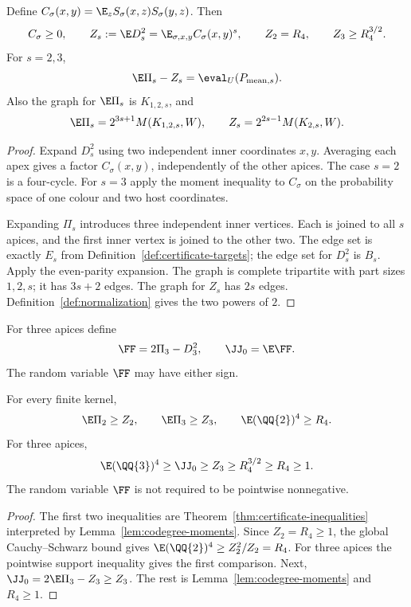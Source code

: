 \begin{lemma}
\label{lem:codegree-moments}
\proved Define $C_\sigma(x,y)=\E_zS_\sigma(x,z)S_\sigma(y,z)$.  Then
\[
 C_\sigma\ge0,\qquad
 Z_s:=\E D_s^2=\E_{\sigma,x,y}C_\sigma(x,y)^s,
 \qquad Z_2=R_4,\qquad Z_3\ge R_4^{3/2}.
\]
For $s=2,3$,
\[
 \E\Pi_s-Z_s=\eval_U(P_{\mathrm{mean},s}).
\]
Also the graph for $\E\Pi_s$ is $K_{1,2,s}$, and
\[
 \E\Pi_s=2^{3s+1}M(K_{1,2,s},W),\qquad
 Z_s=2^{2s-1}M(K_{2,s},W).
\]
\end{lemma}
\begin{proof}
Expand $D_s^2$ using two independent inner coordinates $x,y$.  Averaging each apex gives
a factor $C_\sigma(x,y)$, independently of the other apices.  The case $s=2$ is a four-cycle.
For $s=3$ apply the moment inequality to $C_\sigma$ on the probability space of one colour
and two host coordinates.

Expanding $\Pi_s$ introduces three independent inner vertices.  Each is joined to all
$s$ apices, and the first inner vertex is joined to the other two.  The edge set is exactly
$E_s$ from Definition~\ref{def:certificate-targets}; the edge set for $D_s^2$ is $B_s$.
Apply the even-parity expansion.  The graph is complete tripartite with part sizes $1,2,s$;
it has $3s+2$ edges.  The graph for $Z_s$ has $2s$ edges.  Definition~\ref{def:normalization}
gives the two powers of $2$.
\end{proof}

\begin{definition}
\label{def:three-apex-polynomial}
For three apices define
\[
 \FF=2\Pi_3-D_3^2,\qquad \JJ_0=\E\FF.
\]
The random variable $\FF$ may have either sign.
\end{definition}

\begin{corollary}
\label{cor:reference-mean}
\proved For every finite kernel,
\[
 \E\Pi_2\ge Z_2,\qquad \E\Pi_3\ge Z_3,\qquad
 \E(\QQ{2})^4\ge R_4.
\]
For three apices,
\[
 \E(\QQ{3})^4\ge\JJ_0\ge Z_3\ge R_4^{3/2}\ge R_4\ge1.
\]
The random variable $\FF$ is not required to be pointwise nonnegative.
\end{corollary}
\begin{proof}
The first two inequalities are Theorem~\ref{thm:certificate-inequalities} interpreted by
Lemma~\ref{lem:codegree-moments}.  Since $Z_2=R_4\ge1$, the global Cauchy--Schwarz bound
gives $\E(\QQ{2})^4\ge Z_2^2/Z_2=R_4$.  For three apices the pointwise support inequality
gives the first comparison.  Next,
$\JJ_0=2\E\Pi_3-Z_3\ge Z_3$.  The rest is
Lemma~\ref{lem:codegree-moments} and $R_4\ge1$.
\end{proof}


